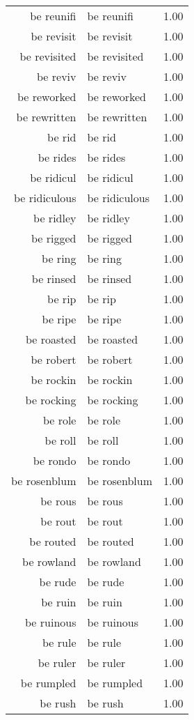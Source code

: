 \begin{table}[ht]
\begin{tabular}{rlr}
  be reunifi & be reunifi & 1.00 \\ 
  be revisit & be revisit & 1.00 \\ 
  be revisited & be revisited & 1.00 \\ 
  be reviv & be reviv & 1.00 \\ 
  be reworked & be reworked & 1.00 \\ 
  be rewritten & be rewritten & 1.00 \\ 
  be rid & be rid & 1.00 \\ 
  be rides & be rides & 1.00 \\ 
  be ridicul & be ridicul & 1.00 \\ 
  be ridiculous & be ridiculous & 1.00 \\ 
  be ridley & be ridley & 1.00 \\ 
  be rigged & be rigged & 1.00 \\ 
  be ring & be ring & 1.00 \\ 
  be rinsed & be rinsed & 1.00 \\ 
  be rip & be rip & 1.00 \\ 
  be ripe & be ripe & 1.00 \\ 
  be roasted & be roasted & 1.00 \\ 
  be robert & be robert & 1.00 \\ 
  be rockin & be rockin & 1.00 \\ 
  be rocking & be rocking & 1.00 \\ 
  be role & be role & 1.00 \\ 
  be roll & be roll & 1.00 \\ 
  be rondo & be rondo & 1.00 \\ 
  be rosenblum & be rosenblum & 1.00 \\ 
  be rous & be rous & 1.00 \\ 
  be rout & be rout & 1.00 \\ 
  be routed & be routed & 1.00 \\ 
  be rowland & be rowland & 1.00 \\ 
  be rude & be rude & 1.00 \\ 
  be ruin & be ruin & 1.00 \\ 
  be ruinous & be ruinous & 1.00 \\ 
  be rule & be rule & 1.00 \\ 
  be ruler & be ruler & 1.00 \\ 
  be rumpled & be rumpled & 1.00 \\ 
  be rush & be rush & 1.00 \\ 

\end{tabular}
\end{table}
